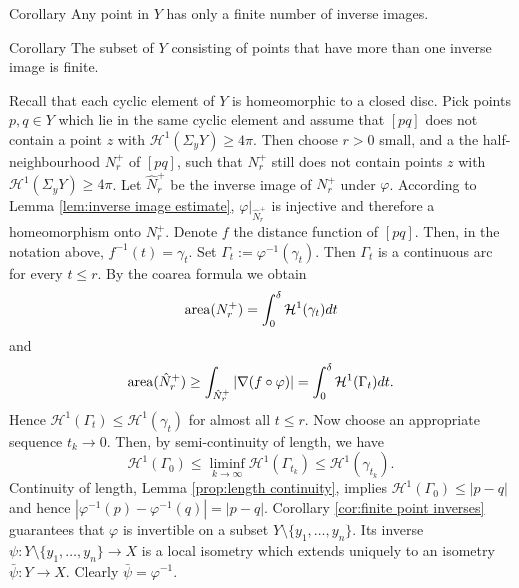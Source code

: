 \documentclass[a4paper,10pt]{amsart}
\begin{document}
\begin{thm}{Corollary}\label{cor:finite point inverses}
Any point in $Y$ has only a finite number of inverse images.
\end{thm}


\begin{thm}{Corollary}\label{cor:finite point inverses}
The subset of $Y$ consisting of points that have more than
one inverse image is finite.
\end{thm}





Recall that each cyclic element of $Y$ is homeomorphic to a closed disc. 
Pick points $p,q\in Y$ which lie in the same cyclic element and assume that
$[pq]$ does not contain a point $z$ with $\mathcal{H}^1(\Sigma_y Y)\geq 4\pi$.
Then choose $r>0$ small, and a the half-neighbourhood $N_r^+$ of $[pq]$, 
such that $N_r^+$ still does not contain points $z$ with 
$\mathcal{H}^1(\Sigma_y Y)\geq 4\pi$. Let $\hat N_r^+$ be the inverse image of $N_r^+$
under $\varphi$. According to Lemma \ref{lem:inverse image estimate}, $\varphi|_{\hat N_r^+}$ 
is injective and therefore a homeomorphism onto $N_r^+$. 
Denote $f$ the distance function of $[pq]$. Then, in the notation above, $f^{-1}(t)=\gamma_t$.
Set $\Gamma_t:=\varphi^{-1}(\gamma_t)$. 
Then $\Gamma_t$ is a continuous arc for every $t\leq r$.
By the coarea formula we obtain
$$
\mathop{\rm area}\nolimits(N_r^+)=\int_0^\delta \mathcal{H}^1(\gamma_t)dt
$$
and
$$
\mathop{\rm area}\nolimits(\hat N_r^+)\geq\int_{\hat N_r^+}|\nabla (f\circ\varphi)|=\int_0^\delta \mathcal{H}^1(\Gamma_t)dt.
$$
Hence $\mathcal{H}^1(\Gamma_t)\leq \mathcal{H}^1(\gamma_t)$ for almost all $t\leq r$.
Now choose an appropriate sequence $t_k\to 0$. Then, by semi-continuity of length, we have
$$
\mathcal{H}^1(\Gamma_0)\leq \liminf_{k\to\infty}\mathcal{H}^1(\Gamma_{t_k})\leq\mathcal{H}^1(\gamma_{t_k}).
$$
Continuity of length, Lemma \ref{prop:length continuity}, implies
$\mathcal{H}^1(\Gamma_0)\leq|p-q|$ and hence $|\varphi^{-1}(p)-\varphi^{-1}(q)|=|p-q|$. 
Corollary \ref{cor:finite point inverses} guarantees that $\varphi$ is invertible on a subset 
$Y\setminus\{y_1,\ldots,y_n\}$. Its inverse $\psi:Y\setminus\{y_1,\ldots,y_n\}\to X$ is a local
isometry which extends uniquely to an isometry $\bar\psi:Y\to X$. Clearly $\bar\psi=\varphi^{-1}$.
\qeds
\end{document}
